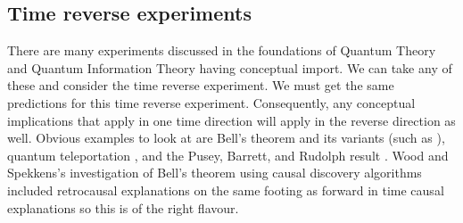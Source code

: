 \documentclass[10pt]{article}
\begin{document}
\subsection{Time reverse experiments}

There are many experiments discussed in the foundations of Quantum Theory and Quantum Information Theory having conceptual import.  We can take any of these and consider the time reverse experiment.  We must get the same predictions for this time reverse experiment.  Consequently, any conceptual implications that apply in one time direction will apply in the reverse direction as well.  Obvious examples to look at are Bell's theorem \cite{bell1964einstein} and its variants (such as \cite{greenberger1989going, hardy1993nonlocality}), quantum teleportation \cite{bennett1993teleporting}, and the Pusey, Barrett, and Rudolph result \cite{pusey2012reality}.  Wood and Spekkens's investigation of Bell's theorem \cite{wood2015lesson} using causal discovery algorithms included retrocausal explanations on the same footing as forward in time causal explanations so this is of the right flavour.
\end{document}
